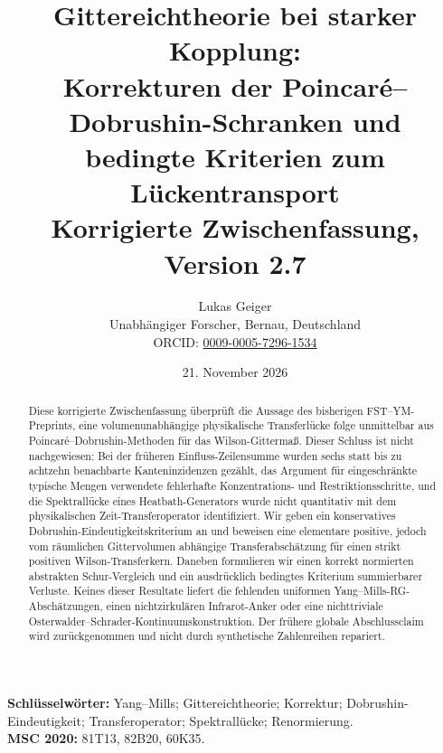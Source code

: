 \documentclass[11pt,a4paper]{article}
\title{\textbf{Gittereichtheorie bei starker Kopplung:\\
Korrekturen der Poincar\'e--Dobrushin-Schranken und\\
bedingte Kriterien zum Lückentransport}\\[4pt]
\large Korrigierte Zwischenfassung, Version 2.7}
\author{Lukas Geiger\\
\small Unabhängiger Forscher, Bernau, Deutschland\\
\small ORCID: \href{https://orcid.org/0009-0005-7296-1534}{0009-0005-7296-1534}}
\date{21. November 2026}
\theoremstyle{remark}
\begin{document}
\maketitle
\thispagestyle{empty}
\begin{center}
\end{center}
\begin{abstract}
Diese korrigierte Zwischenfassung überprüft die Aussage des bisherigen
FST--YM-Preprints, eine volumenunabhängige physikalische Transferlücke
folge unmittelbar aus Poincar\'e--Dobrushin-Methoden für das
Wilson-Gittermaß. Dieser Schluss ist nicht nachgewiesen:
Bei der früheren Einfluss-Zeilensumme wurden sechs statt bis zu
achtzehn benachbarte Kanteninzidenzen gezählt, das Argument für
eingeschränkte typische Mengen verwendete fehlerhafte
Konzentrations- und Restriktionsschritte, und die Spektrallücke eines
Heatbath-Generators wurde nicht quantitativ mit dem physikalischen
Zeit-Transferoperator identifiziert. Wir geben ein konservatives
Dobrushin-Eindeutigkeitskriterium an und beweisen eine elementare
positive, jedoch vom räumlichen Gittervolumen abhängige
Transferabschätzung für einen strikt positiven Wilson-Transferkern.
Daneben formulieren wir einen korrekt normierten abstrakten
Schur-Vergleich und ein ausdrücklich bedingtes Kriterium
summierbarer Verluste. Keines dieser Resultate liefert die
fehlenden uniformen Yang--Mills-RG-Abschätzungen, einen
nichtzirkulären Infrarot-Anker oder eine nichttriviale
Osterwalder--Schrader-Kontinuumskonstruktion. Der frühere
globale Abschlussclaim wird zurückgenommen und nicht durch
synthetische Zahlenreihen repariert.
\end{abstract}
\noindent\textbf{Schlüsselwörter:} Yang--Mills; Gittereichtheorie; Korrektur;
Dobrushin-Eindeutigkeit; Transferoperator; Spektrallücke; Renormierung.\\
\textbf{MSC 2020:} 81T13, 82B20, 60K35.
\clearpage
\end{document}
